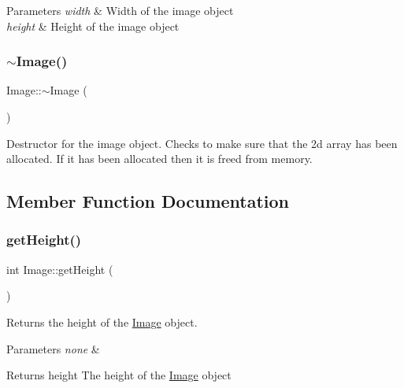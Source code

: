 \begin{DoxyParams}{Parameters}
{\em width} & Width of the image object \\
\hline
{\em height} & Height of the image object \\
\hline
\end{DoxyParams}
\mbox{\label{class_image_a0294f63700543e11c0f0da85601c7ae5}} 
\subsubsection{\texorpdfstring{$\sim$\+Image()}{~Image()}}
{\footnotesize\ttfamily Image\+::$\sim$\+Image (\begin{DoxyParamCaption}{ }\end{DoxyParamCaption})}

Destructor for the image object. Checks to make sure that the 2d array has been allocated. If it has been allocated then it is freed from memory. 

\subsection{Member Function Documentation}
\mbox{\label{class_image_aa4e1f064e5e1f3f04ad605408f1ec3af}} 
\subsubsection{\texorpdfstring{get\+Height()}{getHeight()}}
{\footnotesize\ttfamily int Image\+::get\+Height (\begin{DoxyParamCaption}{ }\end{DoxyParamCaption})}

Returns the height of the \hyperlink{class_image}{Image} object.


\begin{DoxyParams}{Parameters}
{\em none} & \\
\hline
\end{DoxyParams}
\begin{DoxyReturn}{Returns}
height The height of the \hyperlink{class_image}{Image} object 
\end{DoxyReturn}
\mbox{\label{class_image_a06bf6921136ef94ef30a788dbf609ce9}} 
